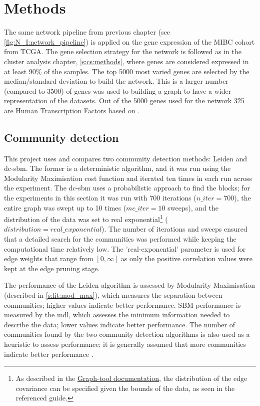 \section{Methods}


The same network pipeline from previous chapter (see \cref{fig:N_I:network_pipeline}) is applied on the gene expression of the MIBC cohort from TCGA. The gene selection strategy for the network is followed as in the cluster analysis chapter, \cref{s:cs:methods}, where genes are considered expressed in at least 90\% of the samples. The top 5000 most varied genes are selected by the median/standard deviation to build the network. This is a larger number (compared to 3500) of genes was used to building a graph to have a wider representation of the datasets. Out of the 5000 genes used for the network 325 are Human Transcription Factors based on \citet{Lambert2018-el}.
 
\subsection*{Community detection} \label{s:N_I:sel_tfs_methods_comm_detection}

This project uses and compares two community detection methods: Leiden and \acrfull{dc-sbm}. The former is a deterministic algorithm, and it was run using the Modularity Maximisation cost function and iterated ten times in each run across the experiment. The \acrshort{dc-sbm} uses a probabilistic approach to find the blocks; for the experiments in this section it was run with 700 iterations ($n\_iter=700$), the entire graph was swept up to 10 times ($mc\_iter=10$ sweeps), and the distribution of the data was set to real exponential\footnote{As described in the \href{https://graph-tool.skewed.de/static/doc/demos/inference/inference.html}{Graph-tool documentation}, the distribution of the edge covariance can be specified given the bounds of the data, as seen in the referenced guide.} ($distribution=real\_exponential$). The number of iterations and sweeps ensured that a detailed search for the communities was performed while keeping the computational time relatively low. The 'real-exponential' parameter is used for edge weights that range from $[0, \infty]$ as only the positive correlation values were kept at the edge pruning stage.

The performance of the Leiden algorithm is assessed by Modularity Maximisation (described in \cref{s:lit:mod_max}), which measures the separation between communities; higher values indicate better performance. SBM performance is measured by the \acrfull{mdl}, which assesses the minimum information needed to describe the data; lower values indicate better performance. The number of communities found by the two community detection algorithms is also used as a heuristic to assess performance; it is generally assumed that more communities indicate better performance \citep{Care2019-ij}.

